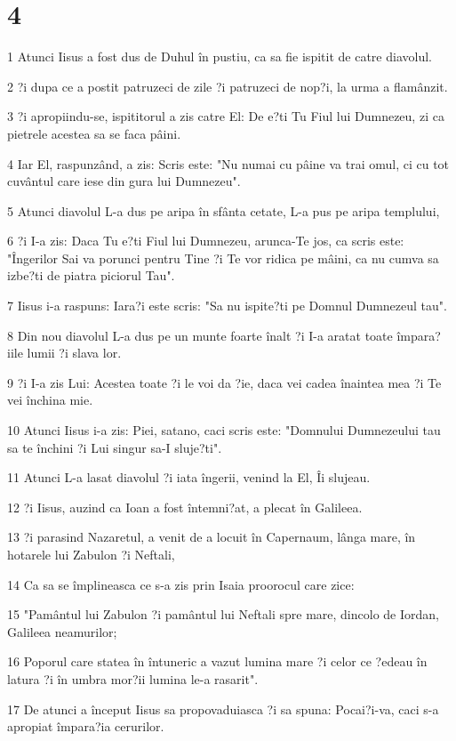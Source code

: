 \chapter{4}

\par 1 Atunci Iisus a fost dus de Duhul în pustiu, ca sa fie ispitit de catre diavolul.
\par 2 ?i dupa ce a postit patruzeci de zile ?i patruzeci de nop?i, la urma a flamânzit.
\par 3 ?i apropiindu-se, ispititorul a zis catre El: De e?ti Tu Fiul lui Dumnezeu, zi ca pietrele acestea sa se faca pâini.
\par 4 Iar El, raspunzând, a zis: Scris este: "Nu numai cu pâine va trai omul, ci cu tot cuvântul care iese din gura lui Dumnezeu".
\par 5 Atunci diavolul L-a dus pe aripa în sfânta cetate, L-a pus pe aripa templului,
\par 6 ?i I-a zis: Daca Tu e?ti Fiul lui Dumnezeu, arunca-Te jos, ca scris este: "Îngerilor Sai va porunci pentru Tine ?i Te vor ridica pe mâini, ca nu cumva sa izbe?ti de piatra piciorul Tau".
\par 7 Iisus i-a raspuns: Iara?i este scris: "Sa nu ispite?ti pe Domnul Dumnezeul tau".
\par 8 Din nou diavolul L-a dus pe un munte foarte înalt ?i I-a aratat toate împara?iile lumii ?i slava lor.
\par 9 ?i I-a zis Lui: Acestea toate ?i le voi da ?ie, daca vei cadea înaintea mea ?i Te vei închina mie.
\par 10 Atunci Iisus i-a zis: Piei, satano, caci scris este: "Domnului Dumnezeului tau sa te închini ?i Lui singur sa-I sluje?ti".
\par 11 Atunci L-a lasat diavolul ?i iata îngerii, venind la El, Îi slujeau.
\par 12 ?i Iisus, auzind ca Ioan a fost întemni?at, a plecat în Galileea.
\par 13 ?i parasind Nazaretul, a venit de a locuit în Capernaum, lânga mare, în hotarele lui Zabulon ?i Neftali,
\par 14 Ca sa se împlineasca ce s-a zis prin Isaia proorocul care zice:
\par 15 "Pamântul lui Zabulon ?i pamântul lui Neftali spre mare, dincolo de Iordan, Galileea neamurilor;
\par 16 Poporul care statea în întuneric a vazut lumina mare ?i celor ce ?edeau în latura ?i în umbra mor?ii lumina le-a rasarit".
\par 17 De atunci a început Iisus sa propovaduiasca ?i sa spuna: Pocai?i-va, caci s-a apropiat împara?ia cerurilor.
